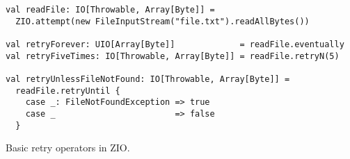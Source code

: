 \begin{algorithm}

\begin{verbatim}
val readFile: IO[Throwable, Array[Byte]] =
  ZIO.attempt(new FileInputStream("file.txt").readAllBytes())

val retryForever: UIO[Array[Byte]]             = readFile.eventually
val retryFiveTimes: IO[Throwable, Array[Byte]] = readFile.retryN(5)

val retryUnlessFileNotFound: IO[Throwable, Array[Byte]] =
  readFile.retryUntil {
    case _: FileNotFoundException => true
    case _                        => false
  }
\end{verbatim}

\caption{Basic retry operators in ZIO. \label{zio:retry}}
\end{algorithm}